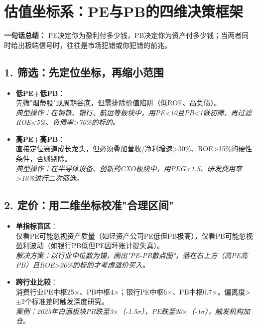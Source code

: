 \section{估值坐标系：PE与PB的四维决策框架}
\textbf{一句话总结：}
PE决定你为盈利付多少钱，PB决定你为资产付多少钱；当两者同时给出极端信号时，往往是市场犯错或你犯错的前兆。

\subsection{1. 筛选：先定位坐标，再缩小范围}
\begin{itemize}[leftmargin=*, nosep]
\item \textbf{低PE+低PB}：\\
先筛"烟蒂股"或周期谷底，但需排除价值陷阱（低ROE、高负债）。\\
\textit{典型操作：在钢铁、银行、航运等板块中，用PE<10且PB<1做初筛，再过滤ROE<5\%、负债率>70\%的标的。}

\item \textbf{高PE+高PB}：\\
直接定位赛道成长龙头，但必须叠加营收/净利增速>30\%、ROE>15\%的硬性条件，否则剔除。\\
\textit{典型操作：在半导体设备、创新药CXO板块中，用PEG<1.5、研发费用率>10\%进行二次筛选。}
\end{itemize}

\subsection{2. 定价：用二维坐标校准"合理区间"}
\begin{itemize}[leftmargin=*, nosep]
\item \textbf{单指标盲区}：\\
仅看PE可能忽视资产质量（如轻资产公司PE低但PB极高），仅看PB可能忽视盈利波动（如银行PB低但PE因坏账计提失真）。\\
\textit{解决方案：以行业中位数为锚，画出"PE-PB散点图"，落在右上方（高PE高PB）且ROE>20\%的标的才考虑溢价买入。}

\item \textbf{跨行业比较}：\\
消费行业PE中枢25$\times$、PB中枢4$\times$；银行PE中枢6$\times$、PB中枢0.7$\times$。偏离度>$\pm$2个标准差时触发深度研究。\\
\textit{案例：2023年白酒板块PB跌至3$\times$（-1.5$\sigma$），PE跌至20$\times$（-1$\sigma$），触发机构加仓。}
\end{itemize}

